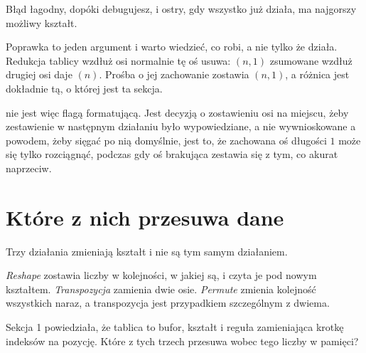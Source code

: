 \begin{fr}
Błąd łagodny, dopóki debugujesz, i ostry, gdy wszystko już działa, ma najgorszy
możliwy kształt.

\begin{aibox}
Poprawka to jeden argument i warto wiedzieć, co robi, a nie tylko że działa.
Redukcja tablicy wzdłuż osi normalnie tę oś usuwa: $(n, 1)$ zsumowane wzdłuż
drugiej osi daje $(n)$. Prośba o jej zachowanie zostawia $(n, 1)$, a różnica
jest dokładnie tą, o której jest ta sekcja.

 nie jest więc flagą formatującą. Jest decyzją o zostawieniu osi
na miejscu, żeby zestawienie w następnym działaniu było wypowiedziane, a nie
wywnioskowane \dash{} a powodem, żeby sięgać po nią domyślnie, jest to, że
zachowana oś długości $1$ może się tylko rozciągnąć, podczas gdy oś brakująca
zestawia się z tym, co akurat naprzeciw.
\end{aibox}
\end{fr}

\section{Które z nich przesuwa dane}
\label{sec:P07-reshape}

\begin{fr}
Trzy działania zmieniają kształt i nie są tym samym działaniem.

\emph{Reshape} zostawia liczby w kolejności, w jakiej są, i czyta je pod nowym
kształtem. \emph{Transpozycja} zamienia dwie osie. \emph{Permute} zmienia
kolejność wszystkich naraz, a transpozycja jest przypadkiem szczególnym z
dwiema.

Sekcja 1 powiedziała, że tablica to bufor, kształt i reguła zamieniająca krotkę
indeksów na pozycję. Które z tych trzech przesuwa wobec tego liczby w pamięci?
\dotline
\nextframe
\end{fr}

